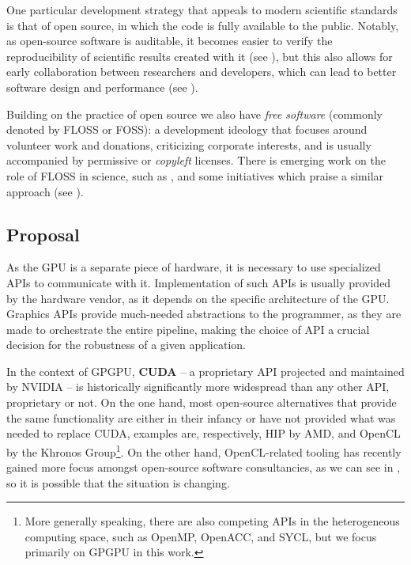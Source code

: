 \documentclass[12pt]{article}
\begin{document}
One particular development strategy that appeals to modern scientific standards
is that of open source, in which the code is fully available to the public.
Notably, as open-source software is auditable, it becomes easier to
verify the reproducibility of scientific results created with it (see
\cite{barba2022defining}), but this also allows for early collaboration between
researchers and developers, which can lead to better software design and
performance (see \cite{wilson2014best}).

Building on the practice of open source we also have \textit{free software}
(commonly denoted by FLOSS or FOSS): a development ideology that focuses around
volunteer work and donations, criticizing corporate interests, and is usually
accompanied by permissive or \textit{copyleft} licenses.
There is emerging work on the role of FLOSS in science, such as
\cite{fortunato2021case}, and some initiatives which praise a similar approach
(see \cite{katz2018community, barker2022introducing}).

\subsection{Proposal} \label{sec:intro:proposal}

As the GPU is a separate piece of hardware, it is necessary to use specialized
APIs to communicate with it.
Implementation of such APIs is usually provided by the hardware vendor, as it
depends on the specific architecture of the GPU.
Graphics APIs provide much-needed abstractions to the programmer, as they are
made to orchestrate the entire pipeline, making the choice of API a crucial
decision for the robustness of a given application.

In the context of GPGPU, \textbf{CUDA} -- a proprietary API
projected and maintained by NVIDIA -- is historically significantly more
widespread than any other API, proprietary or not.
On the one hand, most open-source alternatives that provide the same
functionality are either in their infancy or have not provided what was needed
to replace CUDA, examples are, respectively, HIP by AMD, and OpenCL by the
Khronos Group\footnote{
    More generally speaking, there are also competing APIs in the heterogeneous
    computing space, such as OpenMP, OpenACC, and SYCL, but we focus primarily
    on GPGPU in this work.
}.
On the other hand, OpenCL-related tooling has recently gained more focus
amongst open-source software consultancies, as we can see in
\cite{nicola2022etnaviv}, so it is possible that the situation is changing.
\end{document}
